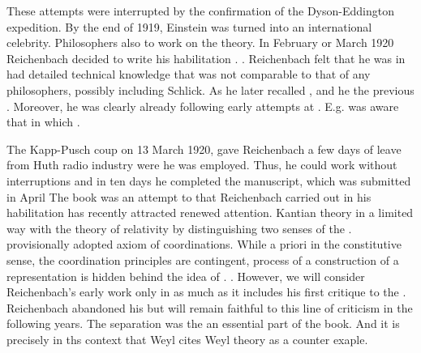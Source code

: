 \documentclass[draft]{article}
\begin{document}
These attempts were interrupted by the confirmation of the Dyson-Eddington expedition. By the end of 1919, Einstein was turned into an international celebrity. Philosophers also to work on the theory. In February or March 1920 Reichenbach decided to write his habilitation . . Reichenbach felt that he was in had detailed technical knowledge that was not comparable to that of any philosophers, possibly including Schlick. As he later recalled , and he the previous . Moreover, he was clearly already following early attempts at \uftp. E.g. was aware that  in which   \citep[028-01-04, Randbemerkung zu Blatt 18]{HR}. 




The Kapp-Pusch coup on 13 March 1920, gave Reichenbach a few days of leave from Huth radio industry were he was employed. Thus, he could work without interruptions and in ten days he completed the manuscript, which was submitted in April The book was an attempt to  that Reichenbach carried out in his habilitation has recently attracted renewed attention. Kantian theory in a limited way with the theory of relativity by distinguishing two senses of the \apr. provisionally adopted axiom of coordinations. While a priori in the constitutive sense, the coordination principles are contingent, process of a construction of a representation is hidden behind the idea of . . However, we will consider Reichenbach's early work only in as much as it includes his first critique to the \uftp. Reichenbach abandoned his  but will remain faithful to this line of criticism in the following years. The separation was the an essential part of the book. And it is precisely in ths context that Weyl cites Weyl theory as a counter exaple.
\end{document}
